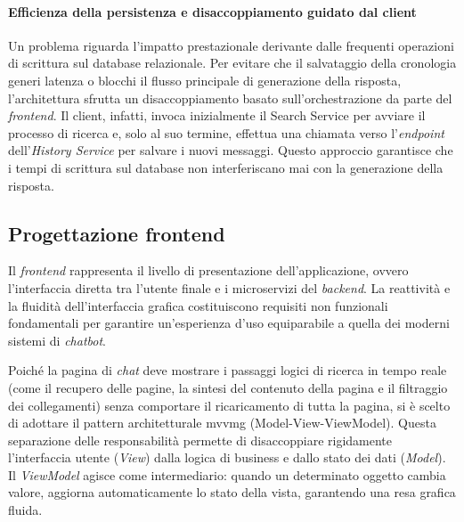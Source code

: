 \paragraph{Efficienza della persistenza e disaccoppiamento guidato dal client}
Un problema riguarda l'impatto prestazionale derivante dalle frequenti 
operazioni di scrittura sul database relazionale.
Per evitare che il salvataggio della 
cronologia generi latenza o blocchi il flusso principale 
di generazione della risposta, l'architettura sfrutta un disaccoppiamento 
basato sull'orchestrazione da parte del \textit{frontend}. 
Il client, infatti, invoca inizialmente il Search Service per avviare il 
processo di ricerca e, solo al suo termine, effettua 
una chiamata verso l'\textit{endpoint} dell'\textit{History Service} per 
salvare i nuovi messaggi. 
Questo approccio garantisce che i tempi di scrittura 
sul database non interferiscano mai con la generazione della risposta.




\subsection{Progettazione frontend}
Il \textit{frontend} rappresenta il livello di presentazione dell'applicazione, 
ovvero l'interfaccia diretta tra l'utente finale e i microservizi del \textit{backend}. 
La reattività e la fluidità dell'interfaccia grafica costituiscono requisiti 
non funzionali fondamentali per garantire un'esperienza d'uso equiparabile a 
quella dei moderni sistemi di \textit{chatbot}.

Poiché la pagina di \textit{chat} deve mostrare i passaggi 
logici di ricerca in tempo reale (come il recupero delle pagine, 
la sintesi del contenuto della pagina e il filtraggio dei collegamenti) 
senza comportare il ricaricamento di tutta la pagina, si è scelto di adottare 
il pattern architetturale \gls{mvvmg} (Model-View-ViewModel). 
Questa separazione delle responsabilità permette di disaccoppiare 
rigidamente l'interfaccia utente (\textit{View}) dalla logica di business 
e dallo stato dei dati (\textit{Model}). 
Il \textit{ViewModel} agisce come intermediario: quando un determinato oggetto 
cambia valore, aggiorna automaticamente lo stato della vista, garantendo una resa 
grafica fluida.

